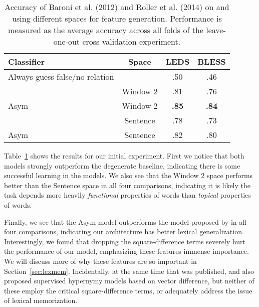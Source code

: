 \begin{table}
  \centering
  \begin{tabular}{|lc|cc|}
    \hline
    {\bf Classifier} & {\bf Space} & {\bf LEDS} & {\bf BLESS}\\
    \hline
    Always guess false/no relation     &   -      & .50          & .46      \\
    \hline
    \cite{baroni:2012:eacl}            & Window 2 & .81          & .76      \\
    Asym \cite{roller:2014:coling}     & Window 2 & {\bf .85}    & {\bf .84}\\
    \cite{baroni:2012:eacl}            & Sentence & .78          & .73      \\
    Asym \cite{roller:2014:coling}     & Sentence & .82          & .80      \\
    \hline
  \end{tabular}
  \caption{Accuracy of Baroni et al. (2012) and Roller et al. (2014) on
  {\bless} and {\entailment}
  using different spaces for feature generation. Performance is measured as
  the average accuracy across all folds of the leave-one-out cross validation
  experiment.}
  \label{tab:asymresults}
\end{table}

Table~\ref{tab:asymresults} shows the results for our initial experiment.
First we notice that both models strongly outperform the degenerate baseline,
indicating there is some successful learning in the models. We also see that
the Window 2 space performs better than the Sentence space in all four
comparisons, indicating it is likely the task depends more heavily {\em
functional} properties of words than {\em topical} properties of words.

Finally, we see that the Asym model outperforms the model proposed by
 in all four comparisons, indicating our architecture
has better lexical generalization.
Interestingly, we found that dropping the square-difference terms
severely hurt the performance of our model, emphasizing these features immense
importance. We will discuss more of why these features are so important in
Section~\ref{sec:lexmem}. Incidentally, at the same time that
 was published,  and
 also proposed supervised hypernymy models based on vector
difference, but neither of these employ the critical square-difference terms,
or adequately address the issue of lexical memorization.

